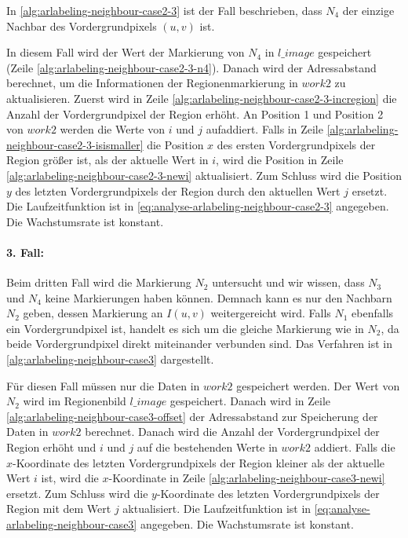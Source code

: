 In \autoref{alg:arlabeling-neighbour-case2-3} ist der Fall beschrieben, dass $N_4$ der einzige Nachbar des
 Vordergrundpixels $(u,v)$ ist.

In diesem Fall wird der Wert der Markierung von $N_4$ in $\mathit{l\_image}$ gespeichert
 (Zeile \ref{alg:arlabeling-neighbour-case2-3-n4}). Danach wird der Adressabstand berechnet, um die Informationen der
 Regionenmarkierung in $\mathit{work2}$ zu aktualisieren. Zuerst wird in Zeile
 \ref{alg:arlabeling-neighbour-case2-3-incregion} die Anzahl der Vordergrundpixel der Region erhöht. An Position 1 und
 Position 2 von $\mathit{work2}$ werden die Werte von $i$ und $j$ aufaddiert. Falls in Zeile
 \ref{alg:arlabeling-neighbour-case2-3-isismaller} die Position $x$ des ersten Vordergrundpixels der Region größer ist,
 als der aktuelle Wert in $i$, wird die Position in Zeile \ref{alg:arlabeling-neighbour-case2-3-newi} aktualisiert. Zum
 Schluss wird die Position $y$ des letzten Vordergrundpixels der Region durch den aktuellen Wert $j$ ersetzt. Die
 Laufzeitfunktion ist in \autoref{eq:analyse-arlabeling-neighbour-case2-3} angegeben. Die Wachstumsrate ist konstant.


\paragraph{3. Fall:} %
\label{par:fall_3_}
Beim dritten Fall wird die Markierung $N_2$ untersucht und wir wissen, dass $N_3$ und $N_4$ keine Markierungen haben
 können. Demnach kann es nur den Nachbarn $N_2$ geben, dessen Markierung an $I(u,v)$ weitergereicht wird. Falls $N_1$
 ebenfalls ein Vordergrundpixel ist, handelt es sich um die gleiche Markierung wie in $N_2$, da beide Vordergrundpixel
 direkt miteinander verbunden sind. Das Verfahren ist in \autoref{alg:arlabeling-neighbour-case3} dargestellt.

Für diesen Fall müssen nur die Daten in $\mathit{work2}$ gespeichert werden. Der Wert von $N_2$ wird im Regionenbild
 $\mathit{l\_image}$ gespeichert. Danach wird in Zeile \ref{alg:arlabeling-neighbour-case3-offset} der Adressabstand
 zur Speicherung der Daten in $\mathit{work2}$ berechnet. Danach wird die Anzahl der Vordergrundpixel der Region erhöht
 und $i$ und $j$ auf die bestehenden Werte in $\mathit{work2}$ addiert. Falls die $x$-Koordinate des letzten
 Vordergrundpixels der Region kleiner als der aktuelle Wert $i$ ist, wird die $x$-Koordinate in Zeile
 \ref{alg:arlabeling-neighbour-case3-newi} ersetzt. Zum Schluss wird die $y$-Koordinate des letzten Vordergrundpixels
 der Region mit dem Wert $j$ aktualisiert. Die Laufzeitfunktion ist in \autoref{eq:analyse-arlabeling-neighbour-case3}
 angegeben. Die Wachstumsrate ist konstant.



